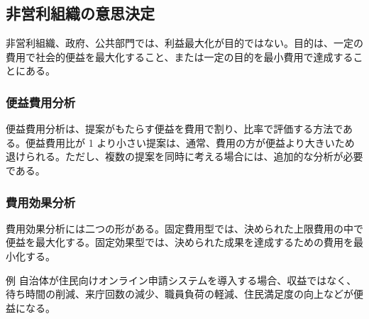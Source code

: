 \subsection{非営利組織の意思決定}

非営利組織、政府、公共部門では、利益最大化が目的ではない。目的は、一定の費用で社会的便益を最大化すること、または一定の目的を最小費用で達成することにある。

\subsubsection{便益費用分析}

便益費用分析は、提案がもたらす便益を費用で割り、比率で評価する方法である。便益費用比が 1 より小さい提案は、通常、費用の方が便益より大きいため退けられる。ただし、複数の提案を同時に考える場合には、追加的な分析が必要である。

\subsubsection{費用効果分析}

費用効果分析には二つの形がある。固定費用型では、決められた上限費用の中で便益を最大化する。固定効果型では、決められた成果を達成するための費用を最小化する。

\begin{notebox}{例}
自治体が住民向けオンライン申請システムを導入する場合、収益ではなく、待ち時間の削減、来庁回数の減少、職員負荷の軽減、住民満足度の向上などが便益になる。
\end{notebox}
